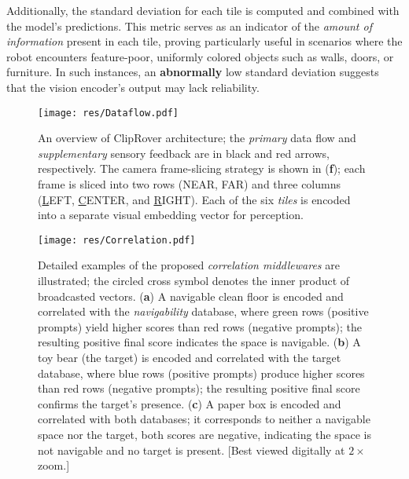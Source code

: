 Additionally, the standard deviation for each tile is computed and combined with the model's predictions. This metric serves as an indicator of the \textit{amount of information} present in each tile, proving particularly useful in scenarios where the robot encounters feature-poor, uniformly colored objects such as walls, doors, or furniture. In such instances, an \textbf{abnormally} low standard deviation suggests that the vision encoder's output may lack reliability.


\begin{figure}
    \centering
    \vspace{-2mm}
    \texttt{[image: res/Dataflow.pdf]}%
    \vspace{-2mm}
    \caption{
        An overview of ClipRover architecture; the \textit{primary}
        data flow and \textit{supplementary} sensory feedback are in black and red arrows, respectively. The camera frame-slicing strategy is shown in (\textbf{f}); each frame is sliced into two rows (NEAR, FAR) and three columns (\underline{L}EFT, \underline{C}ENTER, and \underline{R}IGHT). Each of the six \textit{tiles} is encoded into a separate visual embedding vector for perception.
    }
    \label{fig:arch}
    \vspace{-3mm}
\end{figure}

\begin{figure*}
    \centering
    \texttt{[image: res/Correlation.pdf]}%
    \vspace{-1mm}
    \caption{Detailed examples of the proposed \textit{correlation middlewares} are illustrated; the circled cross symbol denotes the inner product of broadcasted vectors. (\textbf{a}) A navigable clean floor is encoded and correlated with the \textit{navigability} database, where green rows (positive prompts) yield higher scores than red rows (negative prompts); the resulting positive final score indicates the space is navigable. (\textbf{b}) A toy bear (the target) is encoded and correlated with the target database, where blue rows (positive prompts) produce higher scores than red rows (negative prompts); the resulting positive final score confirms the target's presence. (\textbf{c}) A paper box is encoded and correlated with both databases; it corresponds to neither a navigable space nor the target, both scores are negative, indicating the space is not navigable and no target is present. [Best viewed digitally at $2\times$ zoom.]
        }
    \label{fig:correlation}
    \vspace{-2mm}
\end{figure*}



